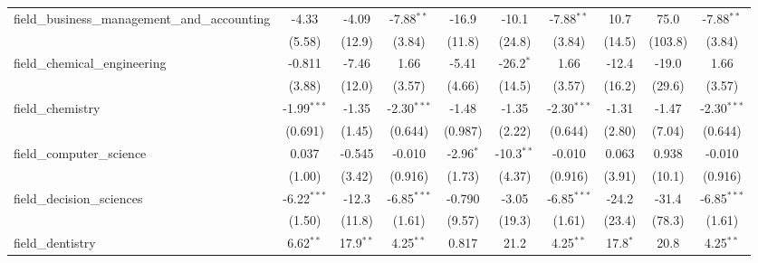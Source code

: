 \begin{tabular}{lccccccccc}
   field\_business\_management\_and\_accounting                & -4.33          & -4.09          & -7.88$^{**}$  & -16.9          & -10.1          & -7.88$^{**}$  & 10.7          & 75.0          & -7.88$^{**}$\\   
                                                               & (5.58)         & (12.9)         & (3.84)        & (11.8)         & (24.8)         & (3.84)        & (14.5)        & (103.8)       & (3.84)\\   
   field\_chemical\_engineering                                & -0.811         & -7.46          & 1.66          & -5.41          & -26.2$^{*}$    & 1.66          & -12.4         & -19.0         & 1.66\\   
                                                               & (3.88)         & (12.0)         & (3.57)        & (4.66)         & (14.5)         & (3.57)        & (16.2)        & (29.6)        & (3.57)\\   
   field\_chemistry                                            & -1.99$^{***}$  & -1.35          & -2.30$^{***}$ & -1.48          & -1.35          & -2.30$^{***}$ & -1.31         & -1.47         & -2.30$^{***}$\\   
                                                               & (0.691)        & (1.45)         & (0.644)       & (0.987)        & (2.22)         & (0.644)       & (2.80)        & (7.04)        & (0.644)\\   
   field\_computer\_science                                    & 0.037          & -0.545         & -0.010        & -2.96$^{*}$    & -10.3$^{**}$   & -0.010        & 0.063         & 0.938         & -0.010\\   
                                                               & (1.00)         & (3.42)         & (0.916)       & (1.73)         & (4.37)         & (0.916)       & (3.91)        & (10.1)        & (0.916)\\   
   field\_decision\_sciences                                   & -6.22$^{***}$  & -12.3          & -6.85$^{***}$ & -0.790         & -3.05          & -6.85$^{***}$ & -24.2         & -31.4         & -6.85$^{***}$\\   
                                                               & (1.50)         & (11.8)         & (1.61)        & (9.57)         & (19.3)         & (1.61)        & (23.4)        & (78.3)        & (1.61)\\   
   field\_dentistry                                            & 6.62$^{**}$    & 17.9$^{**}$    & 4.25$^{**}$   & 0.817          & 21.2           & 4.25$^{**}$   & 17.8$^{*}$    & 20.8          & 4.25$^{**}$\\   

\end{tabular}

